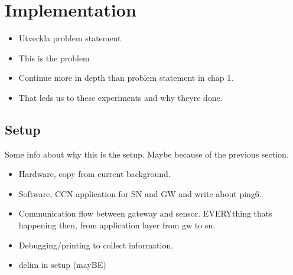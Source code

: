 \section{Implementation}


\begin{itemize}
\item Utveckla problem statement
\item This is the problem
\item Continue more in depth than problem statement in chap 1.
\item That leds us to these experiments and why theyre done.
\end{itemize}


\subsection{Setup}

Some info about why this is the setup. Maybe because of the previous section.
\begin{itemize}
\item Hardware, copy from current background.
\item Software, CCN application for SN and GW and write about ping6.
\item Communication flow between gateway and sensor. EVERYthing thats happening then, from application layer from gw to sn.
\item Debugging/printing to collect information.
\item delim in setup (mayBE)
\end{itemize}









